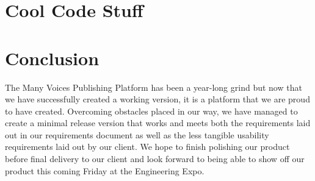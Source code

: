 \documentclass[onecolumn, draftclsnofoot,10pt, compsoc]{IEEEtran}
\begin{document}
\newpage

\section{Cool Code Stuff}

\section{Conclusion}
The Many Voices Publishing Platform has been a year-long grind but now that we
have successfully created a working version, it is a platform that we are proud
to have created. Overcoming obstacles placed in our way, we have managed to create
a minimal release version that works and meets both the requirements laid out
in our requirements document as well as the less tangible usability requirements
laid out by our client. We hope to finish polishing our product before final
delivery to our client and look forward to being able to show off our product
this coming Friday at the Engineering Expo. 
\end{document}
